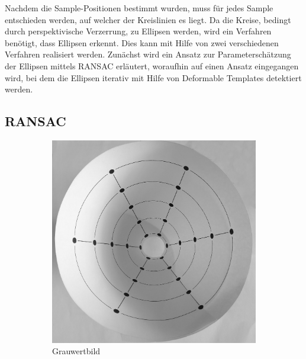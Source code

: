 Nachdem die Sample-Positionen bestimmt wurden, muss für jedes Sample entschieden werden, auf welcher der Kreislinien es liegt. Da die Kreise, bedingt durch perspektivische Verzerrung, zu Ellipsen werden, wird ein Verfahren benötigt, dass Ellipsen erkennt.
Dies kann mit Hilfe von zwei verschiedenen Verfahren realisiert werden. Zunächst wird ein Ansatz zur Parameterschätzung der Ellipsen mittels RANSAC erläutert, woraufhin auf einen Ansatz eingegangen wird, bei dem die Ellipsen iterativ mit Hilfe von Deformable Templates
detektiert werden.

\subsection{RANSAC}


\begin{figure}[!htb]
	\centering
	\begin{subfigure}{.5\textwidth}
		\centering
		\includegraphics[width=.9\textwidth]{images/grey.png}
		\caption{Grauwertbild}
		\label{fig:beforeCanny}
	\end{subfigure}%
	\begin{subfigure}{.5\textwidth}
		\centering

\end{subfigure}
\end{figure}
